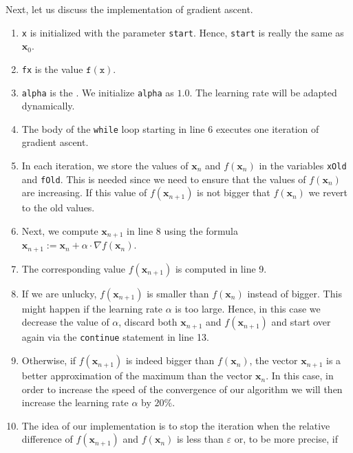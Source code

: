 Next, let us discuss the implementation of gradient ascent.
\begin{enumerate}
\item \texttt{x} is initialized with the parameter \texttt{start}.  Hence, \texttt{start} is really the same as
      $\mathbf{x}_0$. 
\item \texttt{fx} is the value $\texttt{f}(\texttt{x})$.
\item \texttt{alpha} is the .  We initialize \texttt{alpha} as $1.0$.  The learning rate
      will be adapted dynamically. 
\item The body of the \texttt{while} loop starting in line 6 executes one iteration of gradient ascent.
\item In each iteration, we store the values of $\mathbf{x}_n$ and $f(\mathbf{x}_n)$ in the variables
      \texttt{xOld} and \texttt{fOld}.  This is needed since we need to ensure that the values of
      $f(\mathbf{x}_n)$ are increasing.  If this value of $f(\mathbf{x}_{n+1})$ is not bigger that
      $f(\mathbf{x}_n)$ we revert to the old values.
\item Next, we compute $\mathbf{x}_{n+1}$ in line 8 using the formula
      \\[0.2cm]
      \hspace*{1.3cm}
      $\mathbf{x}_{n+1} := \mathbf{x}_n + \alpha \cdot \nabla f(\mathbf{x}_n)$.
\item The corresponding value $f(\mathbf{x}_{n+1})$ is computed in line 9.
\item If we are unlucky, $f(\mathbf{x}_{n+1})$ is smaller than $f(\mathbf{x}_{n})$ instead of bigger.  This might happen if the learning
      rate $\alpha$ is too large.  Hence, in this case we decrease the value of $\alpha$, discard 
      both $\mathbf{x}_{n+1}$ and $f(\mathbf{x}_{n+1})$ and start over again via the \texttt{continue}
      statement in line 13.
\item Otherwise, if  $f(\mathbf{x}_{n+1})$ is indeed bigger than $f(\mathbf{x}_{n})$, the vector
  $\mathbf{x}_{n+1}$ is a better approximation of the maximum than the vector $\mathbf{x}_n$.  
      In this case, in order to increase the speed of the convergence of our algorithm we will then increase the learning rate
      $\alpha$ by $20\%$.    
\item The idea of our implementation is to stop the iteration when the relative difference of
      $f(\mathbf{x}_{n+1})$ and $f(\mathbf{x}_{n})$ is less than $\varepsilon$ or, to be more precise, if
      \\[0.2cm]

\end{enumerate}
